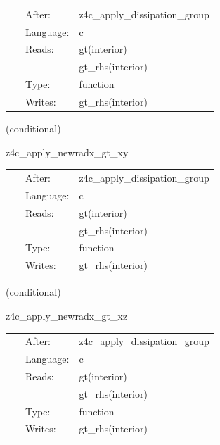 \documentclass{article}
\begin{document}
 \begin{tabular*}{160mm}{cll} 
~ & After:  & z4c\_apply\_dissipation\_group \\ 
~ & Language:  & c \\ 
~ & Reads:  & gt(interior) \\ 
~& ~ &gt\_rhs(interior)\\ 
~ & Type:  & function \\ 
~ & Writes:  & gt\_rhs(interior) \\ 
\end{tabular*} 


\vspace{5mm}

   (conditional) 

\hspace{5mm} z4c\_apply\_newradx\_gt\_xy 



\hspace{5mm}

 \begin{tabular*}{160mm}{cll} 
~ & After:  & z4c\_apply\_dissipation\_group \\ 
~ & Language:  & c \\ 
~ & Reads:  & gt(interior) \\ 
~& ~ &gt\_rhs(interior)\\ 
~ & Type:  & function \\ 
~ & Writes:  & gt\_rhs(interior) \\ 
\end{tabular*} 


\vspace{5mm}

   (conditional) 

\hspace{5mm} z4c\_apply\_newradx\_gt\_xz 



\hspace{5mm}

 \begin{tabular*}{160mm}{cll} 
~ & After:  & z4c\_apply\_dissipation\_group \\ 
~ & Language:  & c \\ 
~ & Reads:  & gt(interior) \\ 
~& ~ &gt\_rhs(interior)\\ 
~ & Type:  & function \\ 
~ & Writes:  & gt\_rhs(interior) \\ 
\end{tabular*} 
\end{document}
